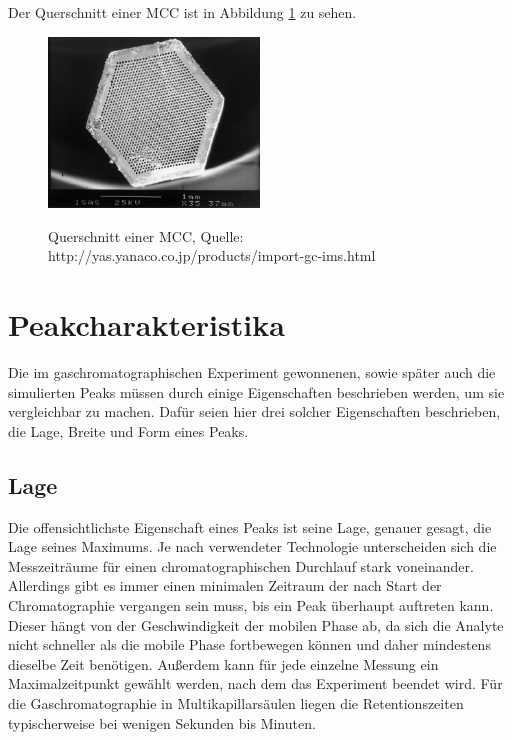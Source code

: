 Der Querschnitt einer MCC ist in Abbildung \ref{MCC} zu sehen.

\begin{figure}[h]
 \centering
  \includegraphics[width = 0.5\textwidth]{bilder/MultiCapillaryColumn}\\
  \caption[Querschnitt einer MCC]{Querschnitt einer MCC, Quelle: http://yas.yanaco.co.jp/products/import-gc-ims.html}
  \label{MCC}
\end{figure}

\section{Peakcharakteristika}
Die im gaschromatographischen Experiment gewonnenen, sowie später auch die simulierten Peaks müssen durch einige Eigenschaften beschrieben werden, um sie vergleichbar zu machen. Dafür seien hier drei solcher Eigenschaften beschrieben, die Lage, Breite und Form eines Peaks.


\subsection{Lage}
Die offensichtlichste Eigenschaft eines Peaks ist seine Lage, genauer gesagt, die Lage seines Maximums. Je nach verwendeter Technologie unterscheiden sich die Messzeiträume für einen chromatographischen Durchlauf stark voneinander. %
Allerdings gibt es immer einen minimalen Zeitraum der nach Start der Chromatographie vergangen sein muss, bis ein Peak überhaupt auftreten kann. Dieser hängt von der Geschwindigkeit der mobilen Phase ab, da sich die Analyte nicht schneller als die mobile Phase fortbewegen können und daher mindestens dieselbe Zeit benötigen. Außerdem kann für jede einzelne Messung ein Maximalzeitpunkt gewählt werden, nach dem das Experiment beendet wird.
Für die Gaschromatographie in Multikapillarsäulen liegen die Retentionszeiten typischerweise bei wenigen Sekunden bis Minuten.



